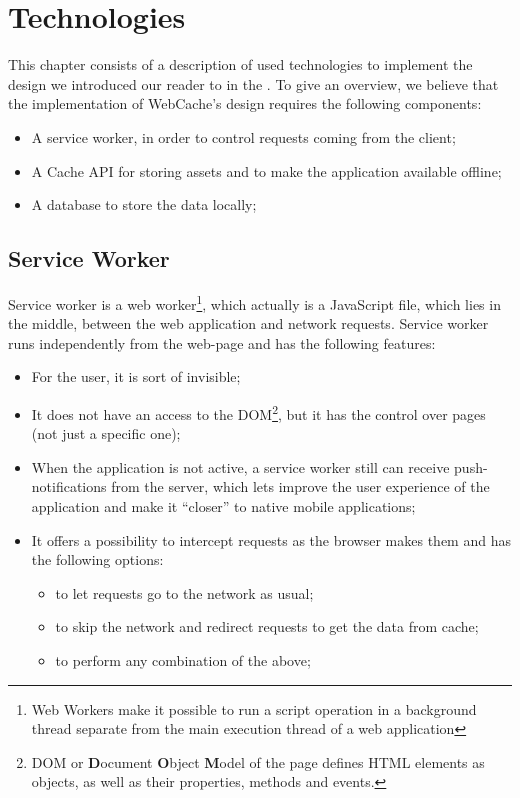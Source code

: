 \chapter{Technologies}
\label{Technologies}

This chapter consists of a description of used technologies to implement the design we introduced our reader to in the . To give an overview, we believe that the implementation of WebCache's design requires the following components:

\begin{itemize}
\item{A service worker, in order to control requests coming from the client;}
\item{A Cache API for storing assets and to make the application available offline;}
\item{A database to store the data locally;}

\end{itemize}

\section{Service Worker}

Service worker\cite{1} is a web worker\footnote{Web Workers make it possible to run a script operation in a background thread separate from the main execution thread of a web application\cite{30}}, which actually is a JavaScript file, which lies in the middle, between the web application and network requests. Service worker runs independently from the web-page and has the following features: 

\begin{itemize}
\item{For the user, it is sort of invisible;}
\item{It does not have an access to the DOM\footnote{DOM or \textbf{D}ocument \textbf{O}bject \textbf{M}odel of the page defines HTML elements as objects, as well as their properties, methods and events.}, but it has the control over pages (not just a specific one);}
\item{When the application is not active, a service worker still can receive push-notifications from the server\cite{32}, which lets improve the user experience of the application and make it ``closer'' to native mobile applications;}
\item{It offers a possibility to intercept requests as the browser makes them and has the following options:}
\begin{itemize}
\item{to let requests go to the network as usual;}
\item{to skip the network and redirect requests to get the data from cache;}
\item{to perform any combination of the above;}
\end{itemize}
\end{itemize}

